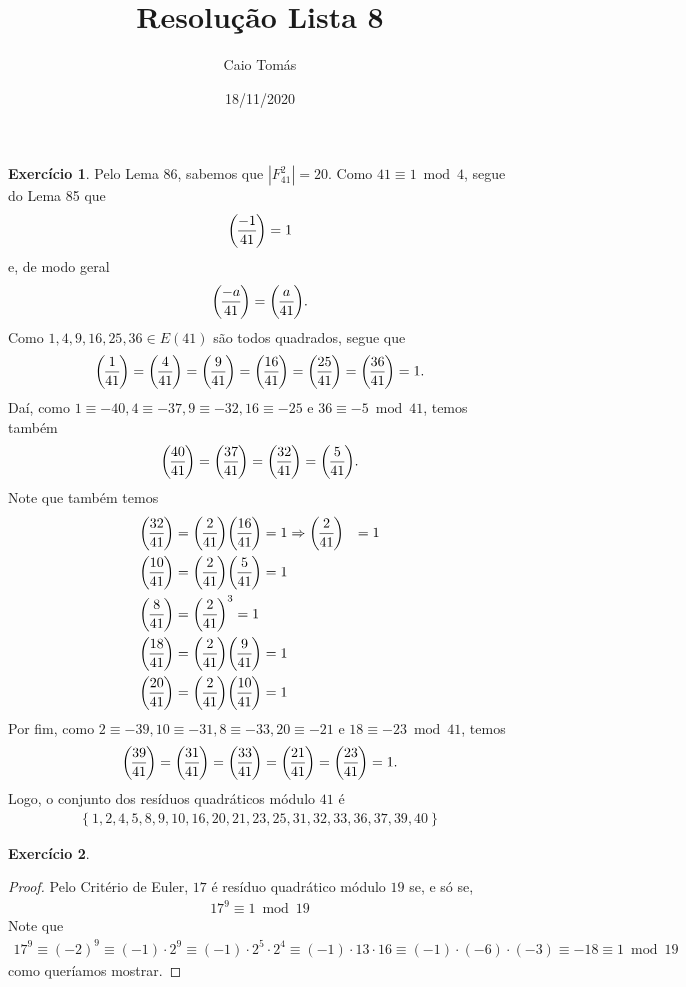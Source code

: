 \documentclass[a4paper,12pt]{article}
\title{Resolução Lista 8}
\date{18/11/2020}
\author{Caio Tomás}
\theoremstyle{definition}
\newtheorem{exercise}{Exercício}%
\newcommand{\genlegendre}[4]{%
	\genfrac{(}{)}{}{#1}{#3}{#4}%
	\if\relax\detokenize{#2}\relax\else_{\!#2}\fi
}
\newcommand{\legendre}[3][]{\genlegendre{}{#1}{#2}{#3}}
\begin{document}
	\maketitle
	\begin{exercise}
		Pelo Lema 86, sabemos que $|F_{41}^2| = 20$. Como $41\equiv 1\bmod 4$, segue do Lema 85 que
		\begin{align*}
		\legendre[]{-1}{41} = 1
		\end{align*}
		e, de modo geral
		\begin{align*}
		\legendre[]{-a}{41} = \legendre[]{a}{41}.
		\end{align*}
		Como $1,4,9,16,25,36\in E(41)$ são todos quadrados, segue que
		\begin{align*}
		\legendre[]{1}{41} = \legendre[]{4}{41} = \legendre[]{9}{41} = \legendre[]{16}{41} = \legendre[]{25}{41} = \legendre[]{36}{41} = 1.
		\end{align*}
		Daí, como $1\equiv -40, 4\equiv -37, 9\equiv -32, 16\equiv -25$ e $36\equiv -5\bmod 41$, temos também
		\begin{align*}
		\legendre[]{40}{41} = \legendre[]{37}{41} = \legendre[]{32}{41} = \legendre[]{5}{41}.
		\end{align*}
		Note que também temos
		\begin{align*}
		\legendre[]{32}{41} &= \legendre[]{2}{41}\legendre[]{16}{41} = 1 \Rightarrow \legendre[]{2}{41} &= 1 \\
		\legendre[]{10}{41} &= \legendre[]{2}{41}\legendre[]{5}{41} = 1 \\
		\legendre[]{8}{41} &= \legendre[]{2}{41}^3 = 1 \\
		\legendre[]{18}{41} &= \legendre[]{2}{41}\legendre[]{9}{41} = 1 \\
		\legendre[]{20}{41} &= \legendre[]{2}{41}\legendre[]{10}{41} = 1
		\end{align*}
		Por fim, como $2\equiv -39, 10\equiv -31, 8\equiv -33, 20\equiv -21$ e $18\equiv -23\bmod 41$, temos
		\begin{align*}
		\legendre[]{39}{41} = \legendre[]{31}{41} = \legendre[]{33}{41} = \legendre[]{21}{41} = \legendre[]{23}{41} = 1.
		\end{align*}
		Logo, o conjunto dos resíduos quadráticos módulo $41$ é
		\begin{align*}
		\left\{ 1,2,4,5,8,9,10,16,20,21,23,25,31,32,33,36,37,39,40 \right\}
		\end{align*}
	\end{exercise}

	\begin{exercise}
		\begin{proof}
			Pelo Critério de Euler, $17$ é resíduo quadrático módulo $19$ se, e só se,
			\begin{align*}
			17^9\equiv 1\bmod 19
			\end{align*}
			Note que
			\begin{align*}
			17^9\equiv (-2)^9\equiv (-1)\cdot 2^9\equiv (-1)\cdot 2^5\cdot 2^4\equiv (-1)\cdot 13\cdot 16\equiv (-1)\cdot (-6)\cdot(-3)\equiv -18\equiv 1\bmod 19
			\end{align*}
			como queríamos mostrar.
		\end{proof}
	\end{exercise}
\end{document}
